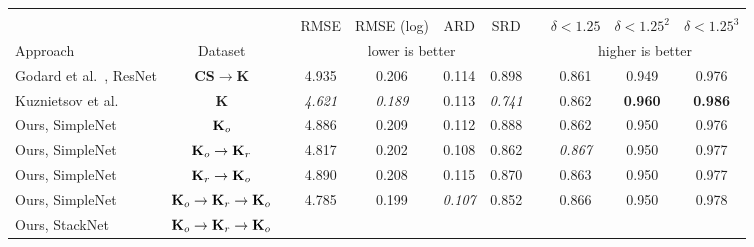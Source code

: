 \documentclass[runningheads]{llncs}
\begin{document}
\begin{table}[tb]
	\centering
	\tiny
	\begin{tabular}{lcccccccccc}
		\hline
		&&&&&&&&&&\\
		&    & &RMSE   & RMSE (log)   & ARD  & SRD  &  & $\delta < 1.25$ & 
		$\delta < 1.25^2$ & $\delta < 1.25^3$ \\ \cline{4-7} \cline{9-11} 
		Approach & Dataset &  & \multicolumn{4}{c}{lower is better} &  & 
		\multicolumn{3}{c}{higher is better} \\
		\hline
		Godard et al.~\cite{godard2016unsupervised}, ResNet  & 
		\textbf{CS}$\rightarrow$\textbf{K}&& 
		4.935 & 0.206 & 0.114 & 0.898 && 
		0.861 & 0.949 & 0.976 \\
		Kuznietsov et al.~\cite{kuznietsov2017semi} &\textbf{K}&& 
		\textit{4.621} & \textit{0.189} & 
		0.113 & \textit{0.741} && 
		0.862 & \textbf{0.960} & \textbf{0.986} \\
		Ours, SimpleNet  &$\text{\textbf{K}}_o$&& 4.886 & 0.209 & 
		0.112 & 
		0.888 && 
		0.862 & 0.950 & 0.976 \\
		Ours, SimpleNet 
		&$\text{\textbf{K}}_o\rightarrow\text{\textbf{K}}_r$&& 4.817 & 
		0.202 & 
		0.108 
		& 0.862 && 
		\textit{0.867} & 0.950 & 0.977 \\
		Ours, SimpleNet 
		&$\text{\textbf{K}}_r\rightarrow\text{\textbf{K}}_o$&& 4.890 & 
		0.208 & 
		0.115 
		& 0.870 && 
		0.863 & 0.950 & 0.977 \\
		Ours, SimpleNet  
		&$\text{\textbf{K}}_o\rightarrow\text{\textbf{K}}_r\rightarrow\text{\textbf{K}}_o$&&
		
		4.785 & 
		0.199 & \textit{0.107} & 
		0.852 && 
		0.866 & 0.950 & 0.978 \\
		Ours, StackNet 
		&$\text{\textbf{K}}_o\rightarrow\text{\textbf{K}}_r\rightarrow\text{\textbf{K}}_o$&&
		

\end{tabular}
\end{table}
\end{document}
